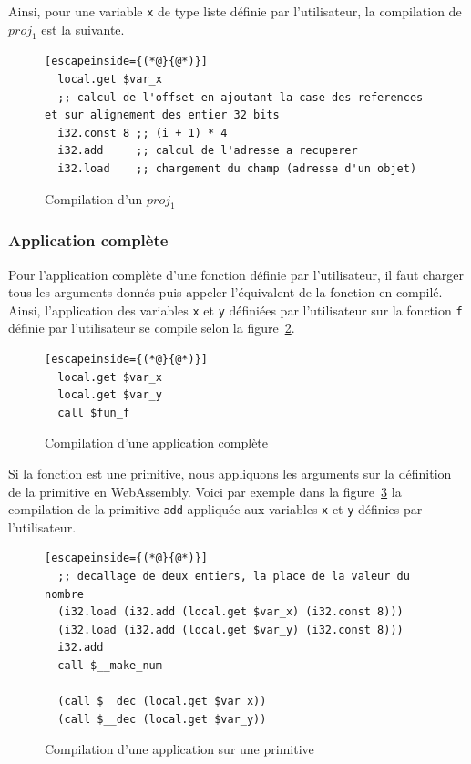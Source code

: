 \documentclass{rapportECL}
\begin{document}
Ainsi, pour une variable \verb|x| de type liste définie par l'utilisateur, la compilation de $proj_1$ est la suivante.
\begin{figure}[H]
	\begin{lstlisting}[escapeinside={(*@}{@*)}]
  local.get $var_x
  ;; calcul de l'offset en ajoutant la case des references et sur alignement des entier 32 bits
  i32.const 8 ;; (i + 1) * 4
  i32.add     ;; calcul de l'adresse a recuperer
  i32.load    ;; chargement du champ (adresse d'un objet)
\end{lstlisting}
\caption{Compilation d'un $proj_1$}
\label{listing:compile_proj}
\end{figure}

\subsubsection{Application complète}

Pour l'application complète d'une fonction définie par l'utilisateur, il faut charger tous les arguments donnés puis appeler 
l'équivalent de la fonction en compilé. Ainsi, l'application des variables \verb|x| et \verb|y| définiées par l'utilisateur sur 
la fonction \verb|f| définie par l'utilisateur se compile selon la figure~\ref{listing:compile_app_comp_const}.

\begin{figure}[H]
	\begin{lstlisting}[escapeinside={(*@}{@*)}]
  local.get $var_x
  local.get $var_y
  call $fun_f
	\end{lstlisting}
	\caption{Compilation d'une application complète}
	\label{listing:compile_app_comp_const}
\end{figure}

Si la fonction est une primitive, nous appliquons les arguments sur la définition de la primitive en WebAssembly.
Voici par exemple dans la figure~\ref{listing:compile_add} la compilation de la primitive \verb|add| appliquée aux variables 
\verb|x| et \verb|y| définies par l'utilisateur.

\begin{figure}[H]
	\begin{lstlisting}[escapeinside={(*@}{@*)}]
  ;; decallage de deux entiers, la place de la valeur du nombre
  (i32.load (i32.add (local.get $var_x) (i32.const 8)))
  (i32.load (i32.add (local.get $var_y) (i32.const 8)))
  i32.add
  call $__make_num
  
  (call $__dec (local.get $var_x))
  (call $__dec (local.get $var_y))
	\end{lstlisting}
	\caption{Compilation d'une application sur une primitive}
	\label{listing:compile_add}
\end{figure}
\end{document}
